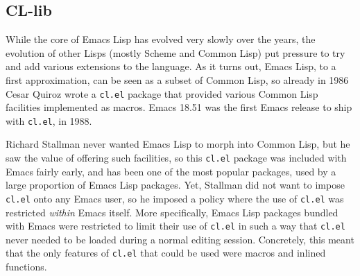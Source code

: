 \documentclass[format=acmsmall, review]{acmart}
\newcommand \Elisp {Emacs Lisp}
\begin{document}
\subsection{CL-lib}          %
\label{sec:cl-clib}

While the core of \Elisp{} has evolved very slowly over the years, the
evolution of other Lisps (mostly Scheme and Common Lisp) put pressure to
try and add various extensions to the language.  As it turns out, \Elisp{},
to a first approximation, can be seen as a subset of Common Lisp, so already
in 1986 Cesar Quiroz  wrote a \texttt{cl.el} package that provided various
Common Lisp facilities implemented as macros.  Emacs 18.51 was the
first Emacs release to ship with \texttt{cl.el}, in 1988.


Richard Stallman never wanted \Elisp{} to morph into Common Lisp, but he saw
the value of offering such facilities, so this \texttt{cl.el} package was
included with Emacs fairly early, and has been one of the most popular
packages, used by a large proportion of \Elisp{} packages.  Yet,
Stallman did
not want to impose \texttt{cl.el} onto any Emacs user, so he imposed
a policy where the use of \texttt{cl.el} was restricted \emph{within} Emacs
itself.  More specifically, \Elisp{} packages bundled with Emacs were
restricted to limit their use of \texttt{cl.el} in such a way that
\texttt{cl.el} never needed to be loaded during a normal editing session.
Concretely, this meant that the only features of \texttt{cl.el} that could
be used were macros and inlined functions.
\end{document}
